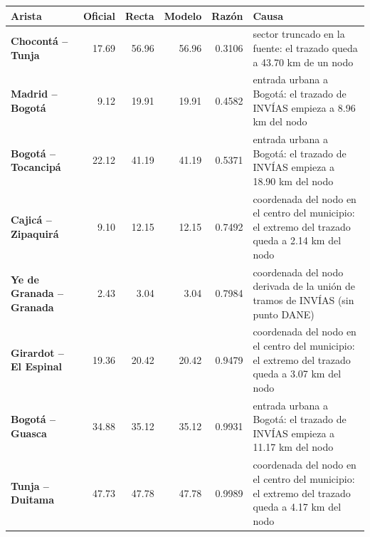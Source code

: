 \renewcommand{\arraystretch}{1.2}
\begin{tabular}{|l|r|r|r|r|>{\raggedright\arraybackslash}p{4.5cm}|}
\hline
\rowcolor{gray!20} \textbf{Arista} & \textbf{Oficial} & \textbf{Recta} & \textbf{Modelo} & \textbf{Razón} & \textbf{Causa} \\
\hline
\textbf{Chocontá -- Tunja} & 17.69 & 56.96 & 56.96 & 0.3106 & sector truncado en la fuente: el trazado queda a 43.70 km de un nodo \\
\hline
\textbf{Madrid -- Bogotá} & 9.12 & 19.91 & 19.91 & 0.4582 & entrada urbana a Bogotá: el trazado de INVÍAS empieza a 8.96 km del nodo \\
\hline
\textbf{Bogotá -- Tocancipá} & 22.12 & 41.19 & 41.19 & 0.5371 & entrada urbana a Bogotá: el trazado de INVÍAS empieza a 18.90 km del nodo \\
\hline
\textbf{Cajicá -- Zipaquirá} & 9.10 & 12.15 & 12.15 & 0.7492 & coordenada del nodo en el centro del municipio: el extremo del trazado queda a 2.14 km del nodo \\
\hline
\textbf{Ye de Granada -- Granada} & 2.43 & 3.04 & 3.04 & 0.7984 & coordenada del nodo derivada de la unión de tramos de INVÍAS (sin punto DANE) \\
\hline
\textbf{Girardot -- El Espinal} & 19.36 & 20.42 & 20.42 & 0.9479 & coordenada del nodo en el centro del municipio: el extremo del trazado queda a 3.07 km del nodo \\
\hline
\textbf{Bogotá -- Guasca} & 34.88 & 35.12 & 35.12 & 0.9931 & entrada urbana a Bogotá: el trazado de INVÍAS empieza a 11.17 km del nodo \\
\hline
\textbf{Tunja -- Duitama} & 47.73 & 47.78 & 47.78 & 0.9989 & coordenada del nodo en el centro del municipio: el extremo del trazado queda a 4.17 km del nodo \\
\hline
\end{tabular}
